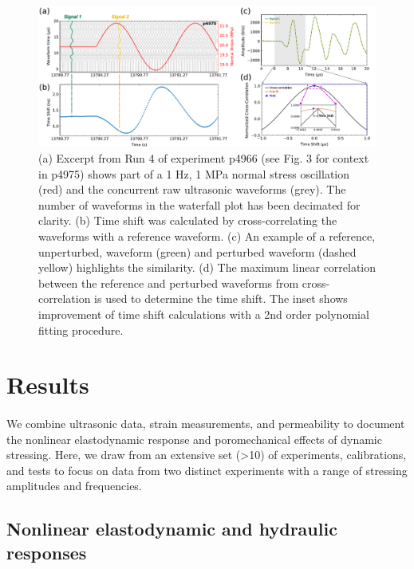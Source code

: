 \documentclass[letterpaper,10pt]{article}
\begin{document}
\newpage

\begin{figure}[ht]
	\centering
	\includegraphics[width=0.9 \columnwidth]{xcor_fig_v3}
	\caption[]{(a) Excerpt from Run 4 of experiment p4966 (see Fig. 3 for context in p4975) shows part of a 1 Hz, 1 MPa normal stress oscillation (red) and the concurrent raw ultrasonic waveforms (grey). The number of waveforms in the waterfall plot has been decimated for clarity. (b) Time shift was calculated by cross-correlating the waveforms with a reference waveform. (c) An example of a reference, unperturbed, waveform (green) and perturbed waveform (dashed yellow) highlights the similarity. (d) The maximum linear correlation between the reference and perturbed waveforms from cross-correlation is used to determine the time shift. The inset shows improvement of time shift calculations with a 2nd order polynomial fitting procedure.}
	\label{fig:xcor_poly}
\end{figure}

\newpage




\section{Results}
\paragraph{}
We combine ultrasonic data, strain measurements, and permeability to document the nonlinear elastodynamic response and poromechanical effects of dynamic stressing. Here, we draw from an extensive set (>10) of experiments, calibrations, and tests to focus on data from two distinct experiments with a range of stressing amplitudes and frequencies.

\subsection{Nonlinear elastodynamic and hydraulic responses}
\end{document}
